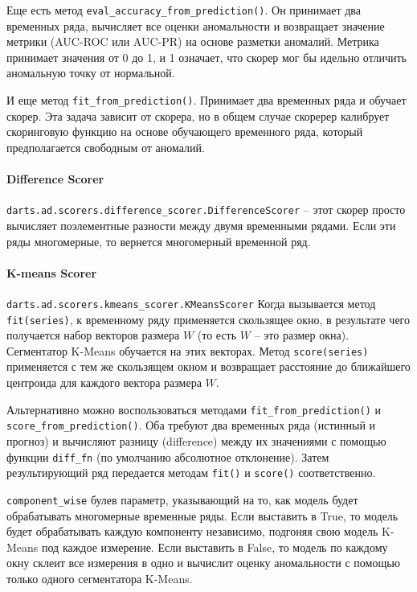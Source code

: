 \documentclass[%
	11pt,
	a4paper,
	utf8,
		]{article}
\begin{document}
Еще есть метод \verb|eval_accuracy_from_prediction()|. Он принимает два временных ряда, вычисляет все оценки аномальности и возвращает значение метрики (AUC-ROC или AUC-PR) на основе разметки аномалий. Метрика принимает значения от 0 до 1, и 1 означает, что скорер мог бы идельно отличить аномальную точку от нормальной.

И еще метод \verb|fit_from_prediction()|. Принимает два временных ряда и обучает скорер. Эта задача зависит от скорера, но в общем случае скоререр калибрует скоринговую функцию на основе обучающего временного ряда, который предполагается свободным от аномалий.

\paragraph{Difference Scorer}

\verb|darts.ad.scorers.difference_scorer.DifferenceScorer| -- этот скорер просто вычисляет поэлементные разности между двумя временными рядами. Если эти ряды многомерные, то вернется многомерный временной ряд.

\paragraph{K-means Scorer}

\verb|darts.ad.scorers.kmeans_scorer.KMeansScorer| Когда вызывается метод \verb|fit(series)|, к временному ряду применяется скользящее окно, в результате чего получается набор векторов размера $ W $ (то есть $ W $ -- это размер окна). Сегментатор K-Means обучается на этих векторах. Метод \verb|score(series)| применяется с тем же скользящем окном и возвращает расстояние до ближайшего центроида для каждого вектора размера $ W $.

Альтернативно можно воспользоваться методами \verb|fit_from_prediction()| и \verb|score_from_prediction()|. Оба требуют два временных ряда (истинный и прогноз) и вычисляют разницу (difference) между их значениями с помощью функции \verb|diff_fn| (по умолчанию абсолютное отклонение). Затем результирующий ряд передается методам \verb|fit()| и \verb|score()| соответственно.

\verb|component_wise| булев параметр, указывающий на то, как модель будет обрабатывать многомерные временные ряды. Если выставить в True, то модель будет обрабатывать каждую компоненту независимо, подгоняя свою модель K-Means под каждое измерение. Если выставить в False, то модель по каждому окну склеит все измерения в одно и вычислит оценку аномальности с помощью только одного сегментатора K-Means.
\end{document}
